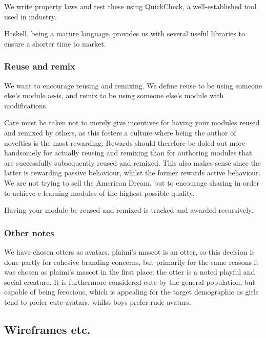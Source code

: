We write property laws and test these using 
QuickCheck\cite{claessen2011quickcheck}, a well-established tool used in 
industry\cite{arts2006testing}.

Haskell, being a mature language, provides us with several useful libraries to 
ensure a shorter time to market.

\subsubsection{Reuse and remix}
We want to encourage reusing and remixing. We define reuse to be using someone 
else's module as-is, and remix to be using someone else's module with 
modifications.

Care must be taken not to merely give incentives for having your modules 
reused and remixed by others, as this fosters a culture where being the author 
of novelties is the most rewarding. Rewards should therefore be doled out more 
handsomely for actually reusing and remixing than for authoring modules that 
are successfully subsequently reused and remixed. This also makes sense since 
the latter is rewarding passive behaviour, whilst the former rewards active 
behaviour. We are not trying to sell the American Dream, but to encourage 
sharing in order to achieve e-learning modules of the highest possible 
quality.

Having your module be reused and remixed is tracked and awarded recursively.

\subsubsection{Other notes}
We have chosen otters as avatars. plaimi's mascot is an otter, so this 
decision is done partly for cohesive branding concerns, but primarily for the 
same reasons it was chosen as plaimi's mascot in the first place: the otter is 
a noted playful and social creature\cite{gordon1908otter}. It is furthermore 
considered cute by the general population, but capable of being 
ferocious\cite{belanger2011review}, which is appealing for the target 
demographic as girls tend to prefer cute avatars, whilst boys prefer rude 
avatars\cite{inal2006children}.

\subsection{Wireframes etc.}

